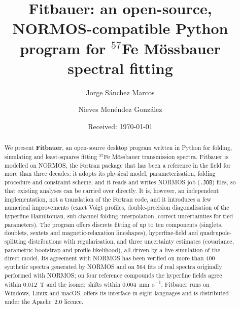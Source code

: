 \documentclass[smallcondensed]{svjour3}
\begin{document}
\title{Fitbauer: an open-source, NORMOS-compatible Python program for
       $^{57}$Fe M\"{o}ssbauer spectral fitting}


\author{Jorge S\'anchez Marcos \and
        Nieves Men\'endez Gonz\'alez}



\date{Received: \today}

\maketitle

\begin{abstract}
We present \textbf{Fitbauer}, an open-source desktop program written in
Python for folding, simulating and least-squares fitting $^{57}$Fe
M\"{o}ssbauer transmission spectra.
Fitbauer is modelled on NORMOS, the Fortran package that has been a
reference in the field for more than three decades: it adopts its
physical model, parameterisation, folding procedure and constraint scheme,
and it reads and writes NORMOS job (\texttt{.JOB}) files, so that existing
analyses can be carried over directly.
It is, however, an independent implementation, not a translation of the
Fortran code, and it introduces a few numerical improvements (exact Voigt
profiles, double-precision diagonalisation of the hyperfine Hamiltonian,
sub-channel folding interpolation, correct uncertainties for tied
parameters).
The program offers discrete fitting of up to ten components (singlets,
doublets, sextets and magnetic-relaxation lineshapes), hyperfine-field and
quadrupole-splitting distributions with regularisation, and three
uncertainty estimates (covariance, parametric bootstrap and profile
likelihood), all driven by a live simulation of the direct model.
Its agreement with NORMOS has been verified on more than 400 synthetic spectra
generated by NORMOS and on 564 fits of real spectra originally performed
with NORMOS; on four reference compounds the hyperfine fields agree within
\SI{0.012}{\tesla} and the isomer shifts within
\SI{0.004}{\milli\metre\per\second}.
Fitbauer runs on Windows, Linux and macOS, offers its interface in eight
languages and is distributed under the Apache~2.0 licence.

\end{abstract}
\end{document}

